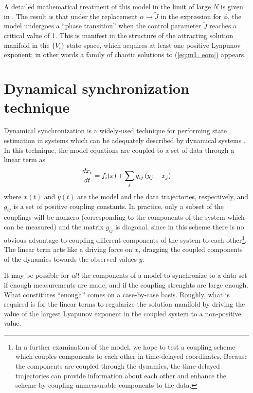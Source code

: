 \documentclass{article} %
\begin{document}
A detailed mathematical treatment of this model in the limit of large $N$ is given in \cite{Sompolinsky1988}.  The result is that under the replacement $\alpha \rightarrow \tilde{J}$ in the expression for $\phi$, the model undergoes a ``phase transition'' when the control parameter $\tilde{J}$ reaches a critical value of 1.  This is manifest in the structure of the attracting solution manifold in the $\{V_i\}$ state space, which acquires at least one positive Lyapunov exponent; in other words a family of chaotic solutions to (\ref{eq:m1_eom}) appears.

\section{Dynamical synchronization technique}
Dynamical synchronization is a widely-used technique for performing state estimation in systems which can be adequately described by dynamical systems \cite{Abarbanel2009}.  In this technique, the model equations are coupled to a set of data through a linear term as
\begin{align}
	\frac{d x_i}{d t} = f_i(x) + \sum_{j} g_{ij} \left(y_j - x_j\right)
\end{align}
where $x(t)$ and $y(t)$ are the model and the data trajectories, respectively, and $g_{ij}$ is a set of positive coupling constants.  In practice, only a subset of the couplings will be nonzero (corresponding to the components of the system which can be measured) and the matrix $g_{ij}$ is diagonal, since in this scheme there is no obvious advantage to coupling different components of the system to each other\footnote{In a further examination of the model, we hope to test a coupling scheme which couples components to each other in time-delayed coordinates.  Because the components are coupled through the dynamics, the time-delayed trajectories can provide information about each other and enhance the scheme by coupling unmeasurable components to the data.}.  The linear term acts like a driving force on $x$, dragging the coupled components of the dynamics towards the observed values $y$.

It may be possible for \emph{all} the components of a model to synchronize to a data set if enough measurements are made, and if the coupling strenghts are large enough.  What constitutes ``enough'' comes on a case-by-case basis.  Roughly, what is required is for the linear terms to regularize the solution manifold by driving the value of the largest Lyapunov exponent in the coupled system to a non-positive value.
\end{document}
